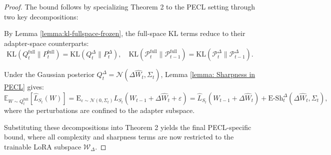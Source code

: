 \documentclass{article} %
\begin{document}
\begin{proof}



The bound follows by specializing Theorem 2 to the PECL setting through two key decompositions:

By Lemma \ref{lemma:kl-fullspace-frozen}, the full-space KL terms reduce to their adapter-space counterparts:
\[
\mathrm{KL}(Q_t^{\mathrm{full}} \| P_t^{\mathrm{full}}) = \mathrm{KL}(Q_t^\Delta \| P_t^\Delta),
\quad
\mathrm{KL}(\mathcal{P}_t^{\mathrm{full}} \| \mathcal{P}_{t-1}^{\mathrm{full}}) = \mathrm{KL}(\mathcal{P}_t^\Delta \| \mathcal{P}_{t-1}^\Delta).
\]

Under the Gaussian posterior $Q_t^\Delta = \mathcal{N}(\Delta\hat{W}_t, \Sigma_t)$, Lemma \ref{lemma: Sharpness in PECL} gives:
\[
\mathbb{E}_{W \sim Q_t^{\mathrm{full}}}[\hat{L}_{S_t}(W)] 
= \mathrm{E}_{\varepsilon \sim \mathcal{N}(0, \Sigma_t)}{L}_{S_t}(W_{t-1}+\Delta\hat{W}_t + \varepsilon)
 = \hat{L}_{S_t}(W_{t-1} + \Delta\hat{W}_t) + \mathrm{E\text{-}Sh}_t^\Delta(\Delta\hat{W}_t, \Sigma_t),
\]
where the perturbations are confined to the adapter subspace.

Substituting these decompositions into Theorem 2 yields the final PECL-specific bound, where all complexity and sharpness terms are now restricted to the trainable LoRA subspace $\mathcal{W}_\Delta$.

\end{proof}
\end{document}
